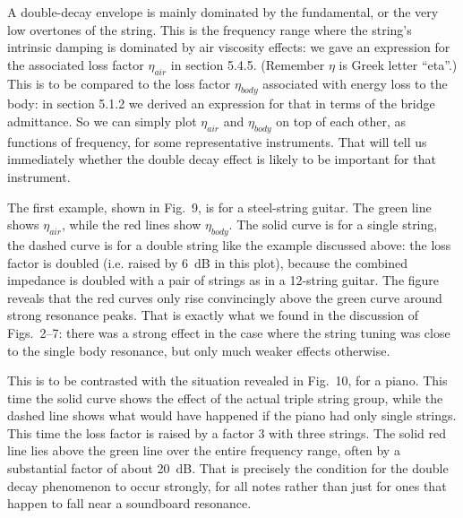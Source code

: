   A double-decay envelope is mainly dominated by the fundamental, or the very 
  low overtones of the string. This is the frequency range where the string’s 
  intrinsic damping is dominated by air viscosity effects: we gave an 
  expression for the associated loss factor $\eta_{air}$ in section 5.4.5. 
  (Remember $\eta$ is Greek letter ``eta''.) This is to be compared to the loss 
  factor $\eta_{body}$ associated with energy loss to the body: in section 
  5.1.2 we derived an expression for that in terms of the bridge admittance. So 
  we can simply plot $\eta_{air}$ and $\eta_{body}$ on top of each other, as 
  functions of frequency, for some representative instruments. That will tell 
  us immediately whether the double decay effect is likely to be important for 
  that instrument. 

  The first example, shown in Fig.\ 9, is for a steel-string guitar. The green 
  line shows $\eta_{air}$, while the red lines show $\eta_{body}$. The solid 
  curve is for a single string, the dashed curve is for a double string like 
  the example discussed above: the loss factor is doubled (i.e. raised by 6~dB 
  in this plot), because the combined impedance is doubled with a pair of 
  strings as in a 12-string guitar. The figure reveals that the red curves only 
  rise convincingly above the green curve around strong resonance peaks. That 
  is exactly what we found in the discussion of Figs.\ 2--7: there was a strong 
  effect in the case where the string tuning was close to the single body 
  resonance, but only much weaker effects otherwise. 


  This is to be contrasted with the situation revealed in Fig.\ 10, for a 
  piano. This time the solid curve shows the effect of the actual triple string 
  group, while the dashed line shows what would have happened if the piano had 
  only single strings. This time the loss factor is raised by a factor 3 with 
  three strings. The solid red line lies above the green line over the entire 
  frequency range, often by a substantial factor of about 20~dB. That is 
  precisely the condition for the double decay phenomenon to occur strongly, 
  for all notes rather than just for ones that happen to fall near a soundboard 
  resonance. 


